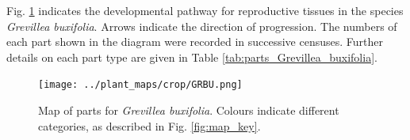 \documentclass[10pt,twoside]{article}\usepackage[]{graphicx}\usepackage[]{color}
\begin{document}
Fig. \ref{fig:map_Grevillea_buxifolia} indicates the developmental pathway for reproductive tissues in the species \emph{Grevillea buxifolia}. Arrows indicate the direction of progression.  The numbers of each part shown in the diagram were recorded in successive censuses. Further details on each part type are given in Table \ref{tab:parts_Grevillea_buxifolia}.

\begin{figure}[h]
\centering
\texttt{[image: ../plant\_maps/crop/GRBU.png]}
\caption{Map of parts for \emph{Grevillea buxifolia}. Colours indicate different categories, as described in Fig. \ref{fig:map_key}.}
\label{fig:map_Grevillea_buxifolia}
\end{figure}

\clearpage

\begingroup\small
\end{document}
